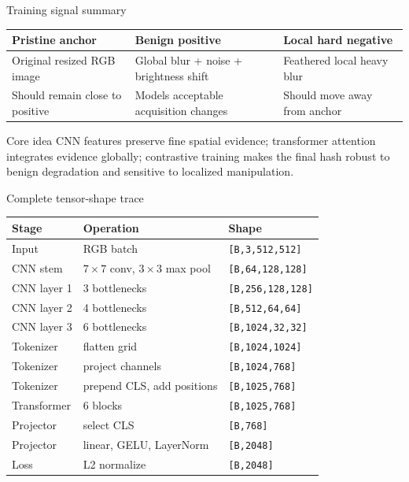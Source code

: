 \documentclass[aspectratio=169,10pt]{beamer}
\newcommand{\shape}[1]{\texttt{#1}}
\begin{document}
\begin{frame}{Training signal summary}
  \centering
  \begin{tabular}{p{}p{}p{}}
    \toprule
    Pristine anchor & Benign positive & Local hard negative\\
    \midrule
    Original resized RGB image &
    Global blur + noise + brightness shift &
    Feathered local heavy blur\\
    Should remain close to positive &
    Models acceptable acquisition changes &
    Should move away from anchor\\
    \bottomrule
  \end{tabular}
  \vspace{1em}
  \begin{block}{Core idea}
    CNN features preserve fine spatial evidence; transformer attention integrates
    evidence globally; contrastive training makes the final hash robust to benign
    degradation and sensitive to localized manipulation.
  \end{block}
\end{frame}

\begin{frame}{Complete tensor-shape trace}
  \centering
  \scriptsize
  \begin{tabular}{lll}
    \toprule
    Stage & Operation & Shape\\
    \midrule
    Input & RGB batch & \shape{[B,3,512,512]}\\
    CNN stem & $7\times7$ conv, $3\times3$ max pool & \shape{[B,64,128,128]}\\
    CNN layer 1 & 3 bottlenecks & \shape{[B,256,128,128]}\\
    CNN layer 2 & 4 bottlenecks & \shape{[B,512,64,64]}\\
    CNN layer 3 & 6 bottlenecks & \shape{[B,1024,32,32]}\\
    Tokenizer & flatten grid & \shape{[B,1024,1024]}\\
    Tokenizer & project channels & \shape{[B,1024,768]}\\
    Tokenizer & prepend CLS, add positions & \shape{[B,1025,768]}\\
    Transformer & 6 blocks & \shape{[B,1025,768]}\\
    Projector & select CLS & \shape{[B,768]}\\
    Projector & linear, GELU, LayerNorm & \shape{[B,2048]}\\
    Loss & L2 normalize & \shape{[B,2048]}\\
    \bottomrule
  \end{tabular}
\end{frame}
\end{document}
